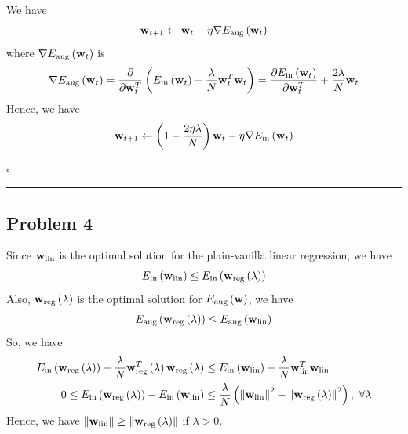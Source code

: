 \documentclass[12pt]{article}
\newcommand*{\QEDB}{\hfill\ensuremath{\square}}
\newcommand{\ParTh}[1]{\left(#1\right)}
\newcommand{\BF}[1]{{\bf#1}}
\newcommand{\VecAbsVal}[1]{\left\|#1\right\|}
\newcommand{\horrule}[1]{\rule{\linewidth}{#1}}
\begin{document}
We have
\begin{align}
\BF{w}_{t+1}\leftarrow\BF{w}_{t}-\eta\nabla E_{\text{aug}}\ParTh{\BF{w}_t}
\end{align}
where $\nabla E_{\text{aug}}\ParTh{\BF{w}_t}$ is
\begin{align}
\nabla E_{\text{aug}}\ParTh{\BF{w}_t}=\dfrac{\partial}{\partial\BF{w}^T_t}\ParTh{E_{\text{in}}\ParTh{\BF{w}_t}+\dfrac{\lambda}{N}\BF{w}^T_t\BF{w}_t}=\dfrac{\partial E_{\text{in}}\ParTh{\BF{w}_t}}{\partial\BF{w}^T_t}+\dfrac{2\lambda}{N}\BF{w}_t
\end{align}
Hence, we have
\begin{align}
\BF{w}_{t+1}\leftarrow\ParTh{1-\dfrac{2\eta\lambda}{N}}\BF{w}_{t}-\eta\nabla E_{\text{in}}\ParTh{\BF{w}_t}
\end{align}

\QEDB

\horrule{0.5pt}

\subsection*{Problem 4}

Since $\BF{w}_{\text{lin}}$ is the optimal solution for the plain-vanilla linear regression, we have
\begin{align}
E_{\text{in}}\ParTh{\BF{w}_{\text{lin}}}\leq E_{\text{in}}\ParTh{\BF{w}_{\text{reg}}\ParTh{\lambda}}
\end{align}
Also, $\BF{w}_{\text{reg}}\ParTh{\lambda}$ is the optimal solution for $E_{\text{aug}}\ParTh{\BF{w}}$, we have
\begin{align}
E_{\text{aug}}\ParTh{\BF{w}_{\text{reg}}\ParTh{\lambda}}\leq E_{\text{aug}}\ParTh{\BF{w}_{\text{lin}}}
\end{align}
So, we have
\begin{align}
E_{\text{in}}\ParTh{\BF{w}_{\text{reg}}\ParTh{\lambda}}+\dfrac{\lambda}{N}\BF{w}^T_{\text{reg}}\ParTh{\lambda}\BF{w}_{\text{reg}}\ParTh{\lambda}&\leq E_{\text{in}}\ParTh{\BF{w}_{\text{lin}}}+\dfrac{\lambda}{N}\BF{w}^T_{\text{lin}}\BF{w}_{\text{lin}}\\
0\leq E_{\text{in}}\ParTh{\BF{w}_{\text{reg}}\ParTh{\lambda}}-E_{\text{in}}\ParTh{\BF{w}_{\text{lin}}}&\leq \dfrac{\lambda}{N}\ParTh{\VecAbsVal{\BF{w}_{\text{lin}}}^2-\VecAbsVal{\BF{w}_{\text{reg}}\ParTh{\lambda}}^2},~\forall\lambda
\end{align}
Hence, we have $\VecAbsVal{\BF{w}_{\text{lin}}}\geq\VecAbsVal{\BF{w}_{\text{reg}}\ParTh{\lambda}}$ if $\lambda>0$.
\end{document}

